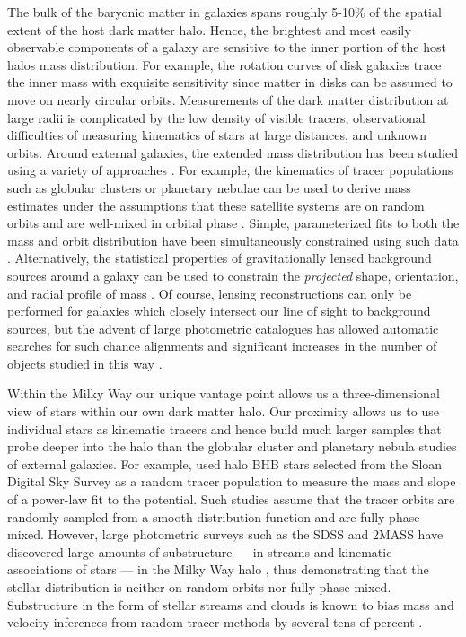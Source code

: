 \documentclass[letterpaper,12pt,preprint]{aastex}
\begin{document}
The bulk of the baryonic matter in galaxies spans roughly 5-10\% of the spatial extent of the host dark matter halo. Hence, the brightest and most easily observable components of a galaxy are sensitive to the inner portion of the host halos mass distribution. For example, the rotation curves of disk galaxies trace the inner mass with exquisite sensitivity since matter in disks can be assumed to move on nearly circular orbits. Measurements of the dark matter distribution at large radii is complicated by the low density of visible tracers, observational difficulties of measuring kinematics of stars at large distances, and unknown orbits. Around external galaxies, the extended mass distribution has been studied using a variety of approaches \citep[see][for a a complete and detailed review]{courteau13}. For example, the kinematics of tracer populations such as globular clusters or planetary nebulae can be used to derive mass estimates under the assumptions that these satellite systems are on random orbits and are well-mixed in orbital phase \citep[early investigations include][]{mendez01,cote03}. Simple, parameterized fits to both the mass and orbit distribution have been simultaneously constrained using such data \citep[e.g.][]{napolitano11,deason12c}. Alternatively, the statistical properties of gravitationally lensed background sources around a galaxy can be used to constrain the \emph{projected} shape, orientation, and radial profile of mass \citep[see, for example, the Lens Structure and Dynamics Survey described in][]{koopmans02}. Of course, lensing reconstructions can only be performed for galaxies which closely intersect our line of sight to background sources, but the advent of large photometric catalogues has allowed automatic searches for such chance alignments and significant increases in the number of objects studied in this way \citep[e.g. the Sloan Lens ACS Survey, see][]{bolton06}.

Within the Milky Way our unique vantage point allows us a three-dimensional view of stars within our own dark matter halo. Our proximity allows us to use individual stars as kinematic tracers and hence build much larger samples that probe deeper into the halo than the globular cluster and planetary nebula studies of external galaxies. For example, \cite{deason12a} used halo BHB stars selected from the Sloan Digital Sky Survey \cite[SDSS;][]{york00} as a random tracer population to measure the mass and slope of a power-law fit to the potential. Such studies assume that the tracer orbits are randomly sampled from a smooth distribution function and are fully phase mixed. However, large photometric surveys such as the SDSS and 2MASS \citep{skrutskie06} have discovered large amounts of substructure --- in streams and kinematic associations of stars --- in the Milky Way halo \citep[e.g.,][]{belokurov06, rochapinto04}, thus demonstrating that the stellar distribution is neither on random orbits nor fully phase-mixed. Substructure in the form of stellar streams and clouds is known to bias mass and velocity inferences from random tracer methods by several tens of percent \citep{yencho06}.
\end{document}

